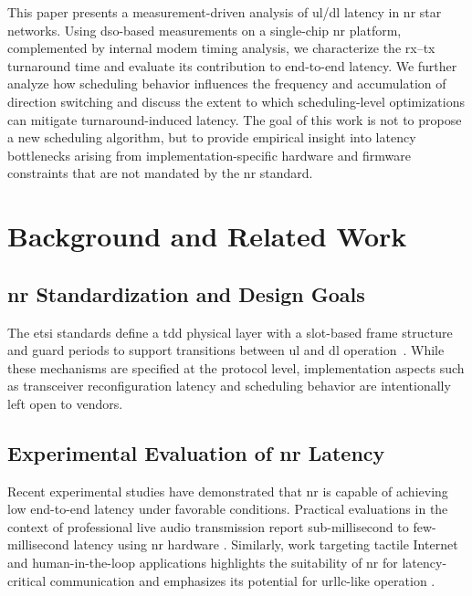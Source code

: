 \documentclass[conference]{IEEEtran}
\begin{document}
This paper presents a measurement-driven analysis of \gls{ul}/\gls{dl} latency in \gls{nr} star networks. Using \gls{dso}-based measurements on a single-chip \gls{nr} platform, complemented by internal modem timing analysis, we characterize the \gls{rx}--\gls{tx} turnaround time and evaluate its contribution to end-to-end latency. We further analyze how scheduling behavior influences the frequency and accumulation of direction switching and discuss the extent to which scheduling-level optimizations can mitigate turnaround-induced latency. The goal of this work is not to propose a new scheduling algorithm, but to provide empirical insight into latency bottlenecks arising from implementation-specific hardware and firmware constraints that are not mandated by the \gls{nr} standard.


\section{Background and Related Work}

\subsection{\gls{nr} Standardization and Design Goals}
 The \gls{etsi} standards define a \gls{tdd} physical layer with a slot-based frame structure and guard periods to support transitions between \gls{ul} and \gls{dl} operation~\cite{TS1036361,TS1036362}. While these mechanisms are specified at the protocol level, implementation aspects such as transceiver reconfiguration latency and scheduling behavior are intentionally left open to vendors.

\subsection{Experimental Evaluation of \gls{nr} Latency}

Recent experimental studies have demonstrated that \gls{nr} is capable of achieving low end-to-end latency under favorable conditions. Practical evaluations in the context of professional live audio transmission report sub-millisecond to few-millisecond latency using \gls{nr} hardware \cite{durreDECT2020NRProfessional2024a}. Similarly, work targeting tactile Internet and human-in-the-loop applications highlights the suitability of \gls{nr} for latency-critical communication and emphasizes its potential for \gls{urllc}-like operation \cite{mudriievskyiCHEAP5GDECT2024}.
\end{document}
